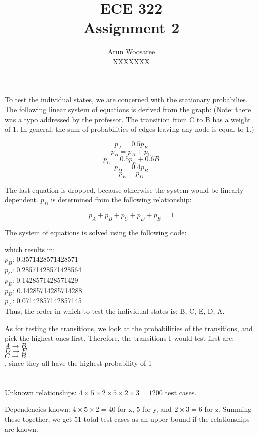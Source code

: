 \documentclass[letterpaper]{article}
\title{ECE 322 \\
Assignment 2}
\author{Arun Woosaree\\
  XXXXXXX}
\begin{document}
\maketitle %

\section{}
To test the individual states, we are concerned with the stationary
probabilies. The following linear system of equations is derived from the
graph: (Note: there was a typo addressed by the professor. The transition from
C to B has a weight of 1. In general, the sum of probabilities of edges leaving
any node is equal to 1.)

  \[ p_A = 0.5p_E \]
  \[ p_B = p_A + p_C \]
  \[ p_C = 0.5p_E + 0.6B \]
  \[ p_D = 0.4p_B \]
  \[ p_E = p_D \]

The last equation is dropped, because otherwise the system would be linearly
dependent. $p_D$ is determined from the following relationship:

  \[ p_A+p_B+p_C+p_D+p_E = 1 \]

The system of equations is solved using the following code:

\vspace{1cm}
\begin{adjustbox}{width=\textwidth}

\end{adjustbox}
\vspace{2cm}

which results in:
\\
$p_B$: 0.3571428571428571\\
$p_C$: 0.28571428571428564\\
$p_E$: 0.1428571428571429\\
$p_D$: 0.14285714285714288\\
$p_A$: 0.07142857142857145\\

Thus, the order in which to test the individual states is: B, C, E, D, A.
\vspace{1cm}

As for testing the transitions, we look at the probabilities of the
transitions, and pick the highest ones first. Therefore, the transitions I
would test first are:
\\
$A\to B$\\
$D\to E$\\
$C\to B$\\

, since they all have the highest probability of 1

\section{}
Unknown relationships: $4 \times 5 \times 2 \times 5 \times 2 \times 3 = 1200$
test cases.

Dependencies known: 
$4 \times 5 \times 2 = 40$ for x, 
$5$ for y, and
$2 \times 3 = 6$ for z.
Summing these together, we get 51 total test cases as an upper bound if the
relationships are known.
\end{document}

